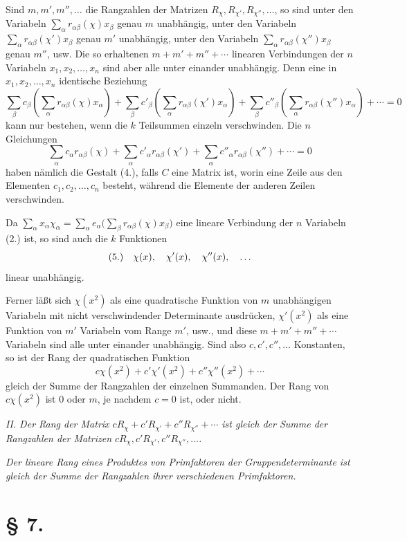 \documentclass[11pt]{article}
\newcommand{\fnum}[1]{\textup{(\ensuremath{#1}.)}\quad}
\begin{document}
Sind $m,m',m'',\ldots$ die Rangzahlen der Matrizen $R_\chi,R_{\chi'},R_{\chi''},\ldots$, so sind unter den Variabeln $\sum_\alpha r_{\alpha\beta}(\chi)x_\beta$ genau $m$ unabhängig, unter den Variabeln $\sum_\alpha r_{\alpha\beta}(\chi')x_\beta$ genau $m'$ unabhängig, unter den Variabeln $\sum_\alpha r_{\alpha\beta}(\chi'')x_\beta$ genau $m''$, usw. Die so erhaltenen $m+m'+m''+\cdots$ linearen Verbindungen der $n$ Variabeln $x_1,x_2,\ldots,x_n$ sind aber alle unter einander unabhängig. Denn eine in $x_1,x_2,\ldots,x_n$ identische Beziehung
\[
 \sum_\beta c_\beta\left(\sum_\alpha r_{\alpha\beta}(\chi)x_\alpha\right)
+\sum_\beta c'_\beta\left(\sum_\alpha r_{\alpha\beta}(\chi')x_\alpha\right)
+\sum_\beta c''_\beta\left(\sum_\alpha r_{\alpha\beta}(\chi'')x_\alpha\right)+\cdots=0
\]
kann nur bestehen, wenn die $k$ Teilsummen einzeln verschwinden. Die $n$ Gleichungen
\[
 \sum_\alpha c_\alpha r_{\alpha\beta}(\chi)
+\sum_\alpha c'_\alpha r_{\alpha\beta}(\chi')
+\sum_\alpha c''_\alpha r_{\alpha\beta}(\chi'')+\cdots=0
\]
haben nämlich die Gestalt (4.), falls $C$ eine Matrix ist, worin eine Zeile aus den Elementen $c_1,c_2,\ldots,c_n$ besteht, während die Elemente der anderen Zeilen verschwinden.

Da $\sum_\alpha x_\alpha\chi_\alpha=\sum_\alpha e_\alpha\bigl(\sum_\beta r_{\alpha\beta}(\chi)x_\beta\bigr)$ eine lineare Verbindung der $n$ Variabeln (2.) ist, so sind auch die $k$ Funktionen
\[
\fnum{5} \chi(x),\quad \chi'(x),\quad \chi''(x),\quad\ldots
\]
linear unabhängig.

Ferner läßt sich $\chi(x^2)$ als eine quadratische Funktion von $m$ unabhängigen Variabeln mit nicht verschwindender Determinante ausdrücken, $\chi'(x^2)$ als eine Funktion von $m'$ Variabeln vom Range $m'$, usw., und diese $m+m'+m''+\cdots$ Variabeln sind alle unter einander unabhängig. Sind also $c,c',c'',\ldots$ Konstanten, so ist der Rang der quadratischen Funktion
\[
 c\chi(x^2)+c'\chi'(x^2)+c''\chi''(x^2)+\cdots
\]
gleich der Summe der Rangzahlen der einzelnen Summanden. Der Rang von $c\chi(x^2)$ ist $0$ oder $m$, je nachdem $c=0$ ist, oder nicht.

\emph{II. Der Rang der Matrix $cR_\chi+c'R_{\chi'}+c''R_{\chi''}+\cdots$ ist gleich der Summe der Rangzahlen der Matrizen $cR_\chi,c'R_{\chi'},c''R_{\chi''},\ldots$.}

\emph{Der lineare Rang eines Produktes von Primfaktoren der Gruppendeterminante ist gleich der Summe der Rangzahlen ihrer verschiedenen Primfaktoren.}

\section*{§ 7.}
\end{document}

